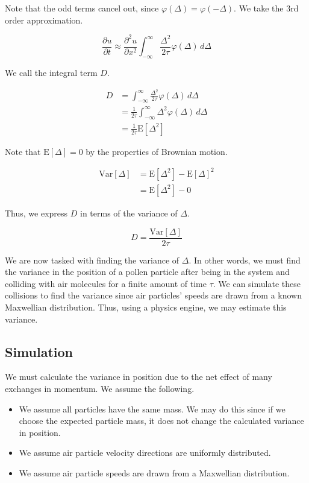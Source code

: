 \documentclass{article}
\renewcommand{\phi}{\varphi}
\newcommand{\E}{\mathrm{E}}
\newcommand{\Var}{\mathrm{Var}}
\begin{document}
Note that the odd terms cancel out, since $\varphi(\Delta) = \varphi(-\Delta)$. We take the 3rd order approximation.

\[ \frac{\partial u}{\partial t} \approx \frac{\partial ^2 u}{\partial x^2} \int_{-\infty}^{\infty} \frac{\Delta^2}{2\tau} \phi(\Delta) \, d\Delta \]

We call the integral term $D$.

\begin{align*}
    D &= \int_{-\infty}^{\infty} \frac{\Delta^2}{2\tau} \phi(\Delta) \, d\Delta \\
    &= \frac{1}{2\tau} \int_{-\infty}^{\infty} \Delta^2 \phi(\Delta) \, d\Delta \\
    &=  \frac{1}{2\tau} \E[\Delta^2]
\end{align*}

Note that $\E[\Delta] = 0$ by the properties of Brownian motion.

\begin{align*}
    \Var [ \Delta ] &= \E [ \Delta ^ 2 ] - \E [\Delta ] ^ 2 \\
    &= \E[\Delta^2] - 0
\end{align*}

Thus, we express $D$ in terms of the variance of $\Delta$.

\[ D = \frac{\Var [ \Delta ] }{2\tau} \]

We are now tasked with finding the variance of $\Delta$. In other words, we must find the variance in the position of a pollen particle after being in the system and colliding with air molecules for a finite amount of time $\tau$. We can simulate these collisions to find the variance since air particles' speeds are drawn from a known Maxwellian distribution. Thus, using a physics engine, we may estimate this variance. 

\subsection{Simulation}

We must calculate the variance in position due to the net effect of many exchanges in momentum. We assume the following.

\begin{itemize}
	\item We assume all particles have the same mass. We may do this since if we choose the expected particle mass, it does not change the calculated variance in position.
	\item We assume air particle velocity directions are uniformly distributed.
	\item We assume air particle speeds are drawn from a Maxwellian distribution.
\end{itemize}
\end{document}
